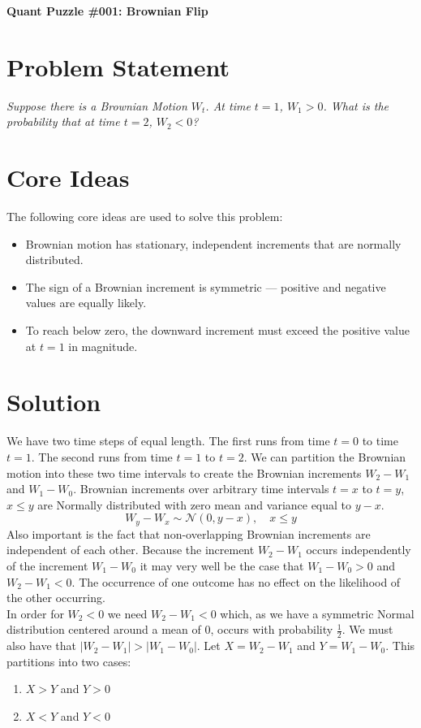 \documentclass[12pt]{article}
\begin{document}
\begin{center}
    \Large \textbf{Quant Puzzle \#001: Brownian Flip}
\end{center}

\section*{Problem Statement}
\textit{
Suppose there is a Brownian Motion $W_t$. At time $t=1$, $W_1 > 0$. What is the probability that at time $t=2$, $W_2 < 0$? 
}

\bigskip

\section*{Core Ideas}
The following core ideas are used to solve this problem:
\begin{itemize}
    \item Brownian motion has stationary, independent increments that are normally distributed.
    \item The sign of a Brownian increment is symmetric — positive and negative values are equally likely.
    \item To reach below zero, the downward increment must exceed the positive value at $t=1$ in magnitude.
\end{itemize}

\bigskip

\section*{Solution}
We have two time steps of equal length. The first runs from time $t=0$ to time $t=1$. The second runs from time $t=1$ to $t=2$. We can partition the Brownian motion into these two time intervals to create the Brownian increments $W_2 - W_1$ and $W_1 - W_0$. Brownian increments over arbitrary time intervals $t=x$ to $t=y$, $x\leq y$ are Normally distributed with zero mean and variance equal to $y-x$.
$$W_y - W_x \sim \mathcal{N}(0, y-x), \quad x\leq y$$
Also important is the fact that non-overlapping Brownian increments are independent of each other. Because the increment $W_2 - W_1$ occurs independently of the increment $W_1 - W_0$ it may very well be the case that $W_1 - W_0 > 0$ and $W_2 - W_1 < 0$. The occurrence of one outcome has no effect on the likelihood of the other occurring.\\

In order for $W_2 < 0$ we need $W_2 - W_1 < 0$ which, as we have a symmetric Normal distribution centered around a mean of $0$, occurs with probability $\frac{1}{2}$. We must also have that $|W_2-W_1| > |W_1 - W_0|$. Let $X = W_2 - W_1$ and $Y=W_1 - W_0$. This partitions into two cases:
\begin{enumerate}
    \item $X > Y$ and $Y > 0$
    \item $X < Y$ and $Y < 0$
\end{enumerate}
\end{document}
